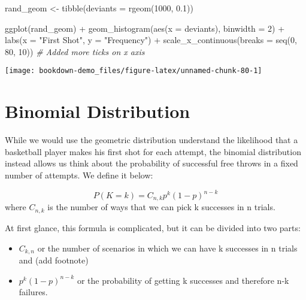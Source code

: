 \documentclass[
]{book}
\newenvironment{Shaded}{\begin{snugshade}}{\end{snugshade}}
\newcommand{\AttributeTok}[1]{\textcolor[rgb]{0.77,0.63,0.00}{#1}}
\newcommand{\CommentTok}[1]{\textcolor[rgb]{0.56,0.35,0.01}{\textit{#1}}}
\newcommand{\DecValTok}[1]{\textcolor[rgb]{0.00,0.00,0.81}{#1}}
\newcommand{\FloatTok}[1]{\textcolor[rgb]{0.00,0.00,0.81}{#1}}
\newcommand{\FunctionTok}[1]{\textcolor[rgb]{0.00,0.00,0.00}{#1}}
\newcommand{\NormalTok}[1]{#1}
\newcommand{\OtherTok}[1]{\textcolor[rgb]{0.56,0.35,0.01}{#1}}
\newcommand{\SpecialCharTok}[1]{\textcolor[rgb]{0.00,0.00,0.00}{#1}}
\newcommand{\StringTok}[1]{\textcolor[rgb]{0.31,0.60,0.02}{#1}}
\begin{document}
\begin{Shaded}
\begin{Highlighting}[]
\NormalTok{rand\_geom }\OtherTok{\textless{}{-}} \FunctionTok{tibble}\NormalTok{(}\AttributeTok{deviants =} \FunctionTok{rgeom}\NormalTok{(}\DecValTok{1000}\NormalTok{, }\FloatTok{0.1}\NormalTok{))}

\FunctionTok{ggplot}\NormalTok{(rand\_geom) }\SpecialCharTok{+}
  \FunctionTok{geom\_histogram}\NormalTok{(}\FunctionTok{aes}\NormalTok{(}\AttributeTok{x =}\NormalTok{ deviants), }
                 \AttributeTok{binwidth =} \DecValTok{2}\NormalTok{) }\SpecialCharTok{+}
  \FunctionTok{labs}\NormalTok{(}\AttributeTok{x =} \StringTok{"First Shot"}\NormalTok{, }\AttributeTok{y =} \StringTok{"Frequency"}\NormalTok{) }\SpecialCharTok{+}
  \FunctionTok{scale\_x\_continuous}\NormalTok{(}\AttributeTok{breaks =} \FunctionTok{seq}\NormalTok{(}\DecValTok{0}\NormalTok{, }\DecValTok{80}\NormalTok{, }\DecValTok{10}\NormalTok{)) }\CommentTok{\# Added more ticks on x axis}
\end{Highlighting}
\end{Shaded}

\begin{center}\texttt{[image: bookdown-demo\_files/figure-latex/unnamed-chunk-80-1]} \end{center}

\hypertarget{binomial-distribution}{%
\section{Binomial Distribution}\label{binomial-distribution}}

While we would use the geometric distribution understand the likelihood that a basketball player makes his first shot for each attempt, the binomial distribution instead allows us think about the probability of successful free throws in a fixed number of attempts. We define it below:

\[P(K = k) = C_{n,k}p^{k}(1-p)^{n-k}\] where \(C_{n,k}\) is the number of ways that we can pick k successes in n trials.

At first glance, this formula is complicated, but it can be divided into two parts:

\begin{itemize}
\item
  \(C_{k,n}\) or the number of scenarios in which we can have k successes in n trials and (add footnote)
\item
  \(p^{k}(1-p)^{n-k}\) or the probability of getting k successes and therefore n-k failures.
\end{itemize}
\end{document}

